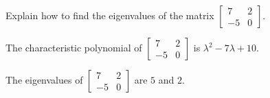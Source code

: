 
\begin{exerciseStatement}


Explain how to find the eigenvalues of the matrix \( \left[\begin{array}{cc}
7 & 2 \\
-5 & 0
\end{array}\right] \).


\end{exerciseStatement}
    
\begin{exerciseAnswer} 


The characteristic polynomial of \( \left[\begin{array}{cc}
7 & 2 \\
-5 & 0
\end{array}\right] \) is \( \lambda^{2} - 7 \lambda + 10 \).



The eigenvalues of \( \left[\begin{array}{cc}
7 & 2 \\
-5 & 0
\end{array}\right] \) are \( 5 \) and \( 2 \).


\end{exerciseAnswer}
    
